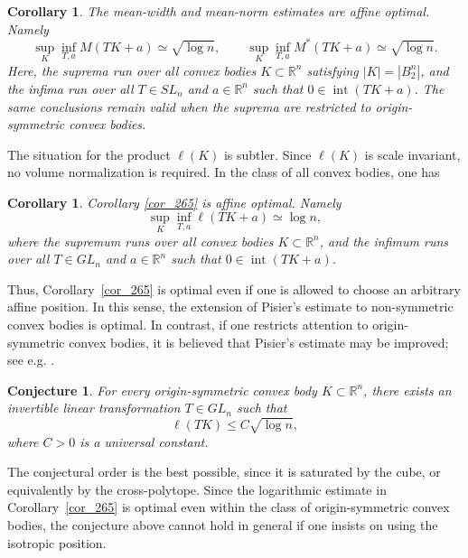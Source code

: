 \documentclass[12pt]{article}
\newtheorem{corollary}[theorem]{Corollary}
\newtheorem{conjecture}[theorem]{Conjecture}
\theoremstyle{definition}
\theoremstyle{remark}
\newcommand{\R}{\mathbb R}
\begin{document}
\begin{corollary}\label{cor_319}
The mean-width and mean-norm estimates are affine optimal. Namely
\begin{equation}\label{eq_321}
  \sup_K\inf_{T,a} M(TK+a)
  \simeq\sqrt{\log n},
  \qquad
  \sup_K\inf_{T,a} M^*(TK+a)
  \simeq\sqrt{\log n}.
\end{equation}
Here, the suprema run over all convex bodies $K\subset\R^n$ satisfying
$|K|=|B_2^n|$, and the infima run over all $T\in SL_n$ and
$a\in\R^n$ such that $0\in\operatorname{int}(TK+a)$. The same
conclusions remain valid when the suprema are restricted to
origin-symmetric convex bodies.

\end{corollary}

The situation for the product $\ell(K)$ is subtler. Since $\ell(K)$
is scale invariant, no volume normalization is required. In the class
of all convex bodies, one has

\begin{corollary}\label{cor_340}
Corollary \ref{cor_265} is affine optimal. Namely
\begin{equation}\label{eq_342}
  \sup_K\inf_{T,a} \ell(TK+a)
  \simeq\log n,
\end{equation}
where the supremum runs over all convex bodies $K\subset\R^n$, and the
infimum runs over all $T\in GL_n$ and $a\in\R^n$ such that
$0\in\operatorname{int}(TK+a)$.
\end{corollary}

Thus, Corollary~\ref{cor_265} is optimal even if one is allowed to
choose an arbitrary affine position. In this sense, the extension of
Pisier's estimate to non-symmetric convex bodies is optimal. In contrast, if one restricts attention to origin-symmetric convex
bodies, it is believed that Pisier's estimate may be improved; see
e.g. \cite[Section~6.8]{ArtsteinAvidanGiannopoulosMilman}.

\begin{conjecture}\label{conj_358}
For every origin-symmetric convex body $K\subset\R^n$, there exists an
invertible linear transformation $T\in GL_n$ such that
\begin{equation}\label{eq_361}
  \ell(TK)\leq C\sqrt{\log n},
\end{equation}
where $C>0$ is a universal constant.
\end{conjecture}

The conjectural order is the best possible, since it is saturated by
the cube, or equivalently by the cross-polytope. Since the logarithmic
estimate in Corollary~\ref{cor_265} is optimal even within the
class of origin-symmetric convex bodies, the conjecture above cannot
hold in general if one insists on using the isotropic position.
\end{document}
